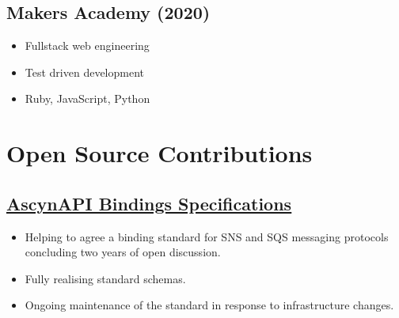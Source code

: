 \documentclass[12pt]{IEEEtran}
\newcommand{\cvrule}{\noindent\rule{8.5cm}{0.4pt}}
\begin{document}
\subsection*{Makers Academy (2020)}
\begin{itemize}
\item Fullstack web engineering
\item Test driven development
\item Ruby, JavaScript, Python \\
\end{itemize}




\section*{\textbf{Open Source Contributions}}
{
\color{blue}
\subsection*{\href{https://github.com/asyncapi/bindings}{\underline{AscynAPI Bindings Specifications}}}
}
\begin{itemize}[topsep=\parskip]
\item Helping to agree a binding standard for SNS and SQS messaging protocols concluding two years of open discussion.
\item Fully realising standard schemas.
\item Ongoing maintenance of the standard in response to infrastructure changes. \\
\end{itemize}
\end{document}

